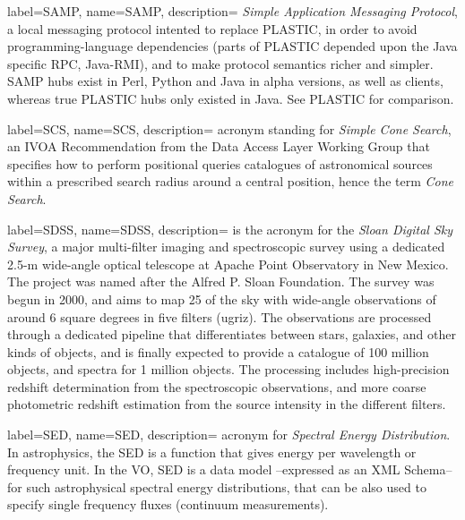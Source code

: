 {
    label={SAMP},
    name={SAMP},
    description={
    	\emph{Simple Application Messaging Protocol}, a local messaging
        protocol intented to replace \gls{PLASTIC}, in order to avoid
        programming-language dependencies (parts of PLASTIC depended
        upon the Java specific RPC, Java-RMI), and to make protocol
        semantics richer and simpler. SAMP hubs exist in \gls{Perl},
        \gls{Python} and \gls{Java} in alpha versions, as well as
        clients, whereas true PLASTIC hubs only existed in Java. See
        \gls{PLASTIC} for comparison.
    }
}

{
    label={SCS},
    name={SCS},
    description={
    	acronym standing for \emph{Simple Cone Search}, an \gls{IVOA}
        \gls{Recommendation} from the \gls{Data Access Layer}
        \gls{Working Group} that specifies how to perform positional
        queries catalogues of astronomical sources within a prescribed
        search radius around a central position, hence the term
        \emph{Cone Search}.
    }
}

{
    label={SDSS},
    name={SDSS},
    description={
    	is the acronym for the \emph{Sloan Digital Sky Survey}, a major
        multi-filter imaging and spectroscopic survey using a dedicated
        2.5-m wide-angle optical telescope at Apache Point Observatory
        in New Mexico. The project was named after the Alfred P. Sloan
        Foundation. The survey was begun in 2000, and aims to map 25%
        of the sky with wide-angle observations of around 6 square
        degrees in five filters (ugriz). The observations are processed
        through a dedicated pipeline that differentiates between stars,
        galaxies, and other kinds of objects, and is finally expected
        to provide a catalogue of 100 million objects, and spectra for
        1 million objects. The processing includes high-precision
        redshift determination from the spectroscopic observations, and
        more coarse photometric redshift estimation from the source
        intensity in the different filters.
    }
}

{
    label={SED},
    name={SED},
    description={
    	acronym for \emph{Spectral Energy Distribution}. In
        astrophysics, the SED is a function that gives energy per
        wavelength or frequency unit. In the \gls{VO}, SED is a data
        model --expressed as an \gls{XML} \gls{Schema}-- for such
        astrophysical spectral energy distributions, that can be also
        used to specify single frequency fluxes (continuum
        measurements).
    }
}

